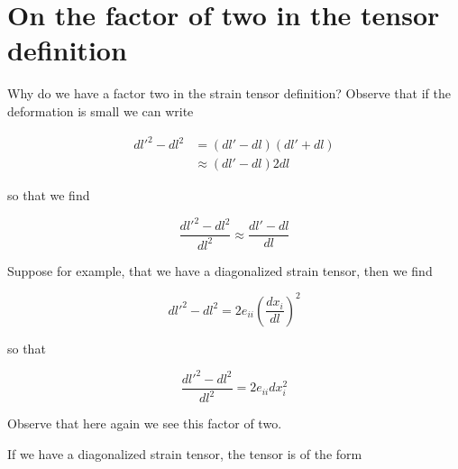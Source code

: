 \label{chap:continuumL3}

\section{On the factor of two in the tensor definition}

%
%
%
%
Why do we have a factor two in the strain tensor definition?  Observe that if the deformation is small we can write

\begin{align*}
{dl'}^2 - dl^2 
&= (dl' - dl)(dl' + dl) \\
&\approx
 (dl' - dl) 2 dl
\end{align*}

so that we find 

\begin{equation}\label{eqn:continuumL3:50}
\frac{{dl'}^2 - dl^2 }{dl^2}
\approx
\frac{dl' - dl }{dl}
\end{equation}

Suppose for example, that we have a diagonalized strain tensor, then we find

\begin{equation}\label{eqn:continuumL3:70}
{dl'}^2 - dl^2 
= 2 e_{ii} \left(\frac{dx_i}{dl}\right)^2
\end{equation}

so that

\begin{equation}\label{eqn:continuumL3:90}
\frac{
{dl'}^2 - dl^2 
}{dl^2}
= 2 e_{ii} dx_i^2
\end{equation}

Observe that here again we see this factor of two.

If we have a diagonalized strain tensor, the tensor is of the form

